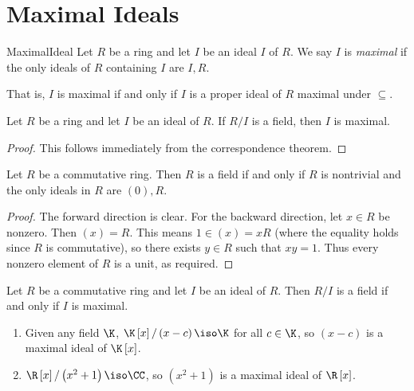 \documentclass[pmath347]{subfiles}
\begin{document}

    \section{Maximal Ideals}

    \begin{definition}{Maximal}{Ideal}
        Let $R$ be a ring and let $I$ be an ideal $I$ of $R$. We say $I$ is \emph{maximal} if the only ideals of $R$ containing $I$ are $I, R$.
    \end{definition}

    \np That is, $I$ is maximal if and only if $I$ is a proper ideal of $R$ maximal under $\subseteq$.

    \begin{prop}{}
        Let $R$ be a ring and let $I$ be an ideal of $R$. If $R /I$ is a field, then $I$ is maximal.
    \end{prop}

    \begin{proof}
        This follows immediately from the correspondence theorem.
    \end{proof}

    \begin{prop}{}
        Let $R$ be a commutative ring. Then $R$ is a field if and only if $R$ is nontrivial and the only ideals in $R$ are $\left( 0 \right) , R$.
    \end{prop}

    \begin{proof}
        The forward direction is clear. For the backward direction, let $x\in R$ be nonzero. Then $\left( x \right) = R$. This means $1\in \left( x \right) = xR$ (where the equality holds since $R$ is commutative), so there exists $y\in R$ such that $xy=1$. Thus every nonzero element of $R$ is a unit, as required.
    \end{proof}

    \begin{theorem}{}
        Let $R$ be a commutative ring and let $I$ be an ideal of $R$. Then $R /I$ is a field if and only if $I$ is maximal.
    \end{theorem}

    \ex
    \begin{enumerate}
        \item Given any field $\K$, $\K\left[ x \right] /\left( x-c \right) \iso \K$ for all $c\in\K$, so $\left( x-c \right)$ is a maximal ideal of $\K\left[ x \right]$.
        \item $\R\left[ x \right] / \left( x^{2} +1 \right) \iso \CC$, so $\left( x^{2} +1 \right)$ is a maximal ideal of $\R\left[ x \right]$.
    \end{enumerate}
\end{document}

